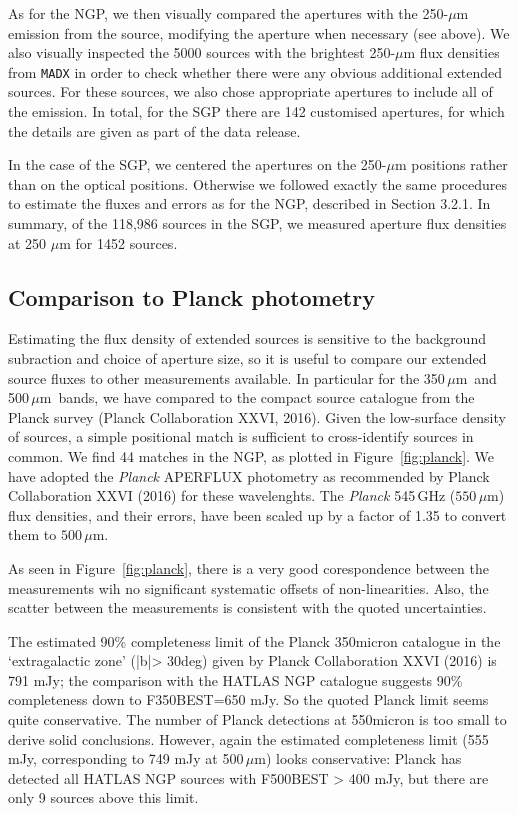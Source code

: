 \documentclass[a4paper,fleqn,usenatbib, twocolumn]{aastex61}
\def\mic{\,$\mu $m}
\begin{document}
As for the NGP, we then visually compared the apertures with the
250-$\mu$m emission from the source, modifying the aperture when
necessary (see above).  We also visually inspected the 5000 sources
with the brightest 250-$\mu$m flux densities from {\tt MADX} in order to
check whether there were any obvious additional extended sources.  For
these sources, we also chose appropriate apertures to include all of
the emission.  In total, for the SGP there are 142 customised
apertures, for which the details are given as part of the data
release.

In the case of the SGP, we centered the apertures on the 250-$\mu$m
positions rather than on the optical positions. Otherwise we followed
exactly the same procedures to estimate the fluxes and errors as for
the NGP, described in Section 3.2.1.  In summary, of the 118,986
sources in the SGP, we measured aperture flux densities at 250 $\mu$m
for 1452 sources.

\subsection{ Comparison to Planck photometry}

Estimating the  flux density of extended sources is sensitive to the
background subraction and choice of aperture size, so it is useful to
compare our extended source fluxes to other measurements available. In
particular for the 350\mic\ and 500\mic\ bands, we have compared to the
compact source catalogue from the Planck survey (Planck Collaboration
XXVI, 2016).  Given the low-surface density of sources, a simple
positional match is sufficient to cross-identify sources in common. We
find 44 matches in the NGP, as plotted in Figure~\ref{fig:planck}.
We have
adopted the \textit{Planck} APERFLUX photometry as recommended by
Planck Collaboration XXVI (2016) for these wavelenghts. The
\textit{Planck} 545\,GHz ($550\,\mu$m) flux densities, and their
errors, have been scaled up by a factor of 1.35 to convert them to
$500\,\mu$m.

As seen in Figure~\ref{fig:planck}, there is a very good
corespondence between the measurements wih no significant systematic
offsets of non-linearities. Also, the scatter between the measurements
is consistent with the quoted uncertainties.

The estimated 90\% completeness limit of the Planck 350micron
catalogue in the `extragalactic zone' (|b|> 30deg) given by Planck
Collaboration XXVI (2016) is 791 mJy; the comparison with the HATLAS
NGP catalogue suggests 90\% completeness down to F350BEST=650 mJy. So
the quoted Planck limit seems quite conservative. The number of Planck
detections at 550micron is too small to derive solid
conclusions. However, again the estimated completeness limit (555 mJy,
corresponding to 749 mJy at 500\mic) looks conservative: Planck has
detected all HATLAS NGP sources with F500BEST > 400 mJy, but there are
only 9 sources above this limit.
\end{document}

